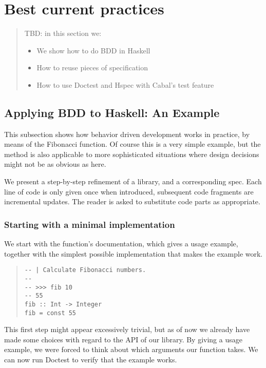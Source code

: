 \documentclass[preprint]{sigplanconf}
\begin{document}
\section{Best current practices}
\label{sec:best-current-practice}

\begin{quote}
    TBD: in this section we:
    \begin{itemize}
        \item We show how to do BDD in Haskell
        \item How to reuse pieces of specification
        \item How to use Doctest and Hspec with Cabal's test feature
    \end{itemize}
\end{quote}

\subsection{Applying BDD to Haskell: An Example}
This subsection shows how behavior driven development works in practice,
by means of the Fibonacci function.  Of course this is a very simple
example, but the method is also applicable to more sophisticated
situations where design decisions might not be as obvious as here.

We present a step-by-step refinement of a library, and a corresponding
spec.  Each line of code is only given once when introduced,
subsequent code fragments are incremental updates.  The reader is
asked to substitute code parts as appropriate.

\subsubsection{Starting with a minimal implementation}

We start with the function's documentation, which gives a usage
example, together with the simplest possible implementation that makes
the example work.

\begin{quote}
\small
\begin{verbatim}
-- | Calculate Fibonacci numbers.
--
-- >>> fib 10
-- 55
fib :: Int -> Integer
fib = const 55
\end{verbatim}
\end{quote}

\noindent This first step might appear excessively trivial, but as of now we
already have made some choices with regard to the API of our library.
By giving a usage example, we were forced to think about which
arguments our function takes.  We can now run Doctest to verify that
the example works.
\end{document}
